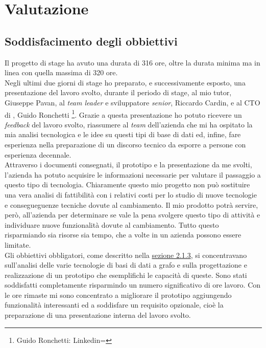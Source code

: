 
\chapter{Valutazione}
\label{cap:resoconto-stage}

\section{Soddisfacimento degli obbiettivi}
Il progetto di stage ha avuto una durata di 316 ore, oltre la durata minima ma in linea con quella massima di 320 ore.\\
Negli ultimi due giorni di stage ho preparato, e successivamente esposto, una presentazione del lavoro svolto, durante il periodo di stage, al mio tutor, Giuseppe Pavan, al \textit{team leader} e sviluppatore \textit{senior}, Riccardo Cardin, e al CTO di \textit{\azienda}, Guido Ronchetti \footnote{Guido Ronchetti: Linkedin= }. Grazie a questa presentazione ho potuto ricevere un \textit{feedback} del lavoro svolto, riassumere al \textit{team} dell'azienda che mi ha ospitato la mia analisi tecnologica e le idee su questi tipi di base di dati ed, infine, fare esperienza nella preparazione di un discorso tecnico da esporre a persone con esperienza decennale.\\
Attraverso i documenti consegnati, il prototipo e la presentazione da me svolti, l'azienda ha potuto acquisire le informazioni necessarie per valutare il passaggio a questo tipo di tecnologia. Chiaramente questo mio progetto non può sostituire una vera analisi di fattibilità con i relativi costi per lo studio di nuove tecnologie e consegueguenze tecniche dovute al cambiamento. Il mio prodotto potrà servire, però, all'azienda per determinare se vale la pena svolgere questo tipo di attività e individuare nuove funzionalità dovute al cambiamento. Tutto questo risparmiando sia risorse sia tempo, che a volte in un azienda possono essere limitate.\\
Gli obbiettivi obbligatori, come descritto nella \hyperlink{sec:pianodl}{sezione 2.1.3}, si concentravano sull'analisi delle varie tecnologie di basi di dati a grafo e sulla progettazione e realizzazione di un prototipo che esemplifichi le capacità di queste. Sono stati soddisfatti completamente risparmindo un numero significativo di ore lavoro. Con le ore rimaste mi sono concentrato a migliorare il prototipo aggiungendo funzionalità interessanti ed a soddisfare un requisito opzionale, cioè la preparazione di una presentazione interna del lavoro svolto.
\newpage
